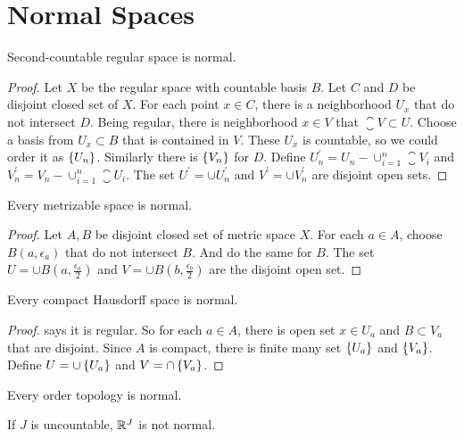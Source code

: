 
\section{Normal Spaces}

\begin{theorem}
    Second-countable regular space is normal.    
\end{theorem}
\begin{proof}
    Let $X$ be the regular space with countable basis $B$. Let $C$ and $D$ be disjoint closed set of $X$. For each point $x \in C$, there is a neighborhood $U_x$ that do not intersect $D$. Being regular, there is neighborhood $x \in V$ that $\closure{V} \subset U$. Choose a basis from $U_x \subset B$ that is contained in $V$. These $U_x$ is countable, so we could order it as $\set{U_n}$. Similarly there is $\set{V_n}$ for $D$. Define $U_n^{'} = U_n - \cup_{i=1}^n \closure{V_i}$ and $V_n^{'} = V_n - \cup_{i=1}^n \closure{U_i}$. The set $U^{'} = \cup U_n^{'}$ and $V^{'} = \cup V_n^{'}$ are disjoint open sets.
\end{proof}

\begin{theorem}
    Every metrizable space is normal.    
\end{theorem}
\begin{proof}
    Let $A,B$ be disjoint closed set of metric space $X$. For each $a \in A$, choose $B(a, \epsilon_a)$ that do not intersect $B$. And do the same for $B$. The set $U = \cup B(a, \frac{\epsilon_a}{2})$ and $V = \cup B(b, \frac{\epsilon_b}{2})$ are the disjoint open set. 
\end{proof}

\begin{theorem}
    Every compact Hausdorff space is normal.    
\end{theorem}
\begin{proof}
     says it is regular. So for each $a \in A$, there is open set $x \in U_a$ and $B \subset V_a$ that are disjoint. Since $A$ is compact, there is finite many set $\set{U_a}$ and $\set{V_a}$. Define $U = \cup \set{U_a}$ and $V = \cap \set{V_a}$.
\end{proof}

\begin{theorem}
    Every order topology is normal.    
\end{theorem}


\begin{theorem}
    If $J$ is uncountable, $\mathbb{R}^J$ is not normal.
\end{theorem}


